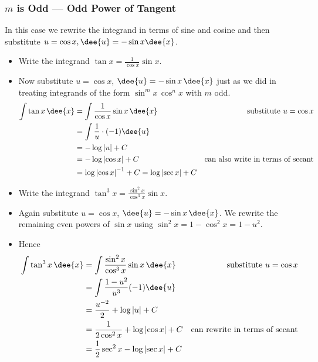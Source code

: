 \subsubsection*{$m$ is Odd --- Odd Power of Tangent}
In this case we rewrite the integrand in terms of sine and cosine and then substitute
$u=\cos x, \dee{u}=-\sin x \dee{x}$.
\begin{eg}\label{eg:TRGINTg}
\soln
\begin{itemize}
 \item Write the integrand $\tan x=\frac{1}{\cos x}\sin x$.
\item Now substitute $u=\cos x$, $\dee{u}=-\sin x\,\dee{x}$ just as we did in treating
integrands of the form $\sin^mx\,\cos^nx$ with $m$ odd.
\begin{align*}
  \int \tan x\,\dee{x}
  &=\int \frac{1}{\cos x}\sin x\,\dee{x} & \text{substitute $u=\cos x$}\\
  &=\int \frac{1}{u} \cdot(-1) \dee{u} \\
  &=-\log|u|+C\\
  &=-\log\left|\cos x\right|+C &\text{can also write in terms of secant}\\
  &=\log\left|\cos x\right|^{-1}+C =\log\left|\sec x\right|+C
\end{align*}
\end{itemize}
\end{eg}
\goodbreak

\begin{eg}\label{eg:TRGINTh}
\soln
\begin{itemize}
 \item Write the integrand $\tan^3 x=\frac{\sin^2x}{\cos^3 x}\sin x$.
 \item Again substitute $u=\cos x$, $\dee{u}=-\sin x\,\dee{x}$. We rewrite the remaining even
powers of $\sin x$ using $\sin^2x=1-\cos^2x=1-u^2$.
\item Hence
\begin{align*}
  \int \tan^3 x\,\dee{x}
  &=\int \frac{\sin^2x}{\cos^3x}\sin x\,\dee{x} & \text{substitute $u=\cos x$}\\
  &=\int \frac{1-u^2}{u^3} (-1) \dee{u} \\
  &=\frac{u^{-2}}{2}+\log|u|+C \\
  &=\frac{1}{2 \cos^2 x}+\log\left|\cos x\right|+C & \text{can rewrite in terms of secant}\\
  &= \frac{1}{2}\sec^2 x - \log\left|\sec x\right|+C \\
\end{align*}
\end{itemize}
\end{eg}


